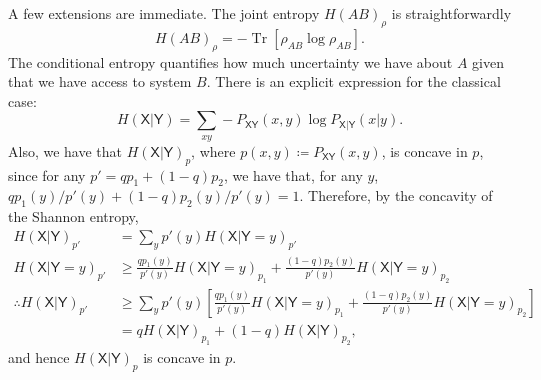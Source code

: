 \documentclass[10pt, a4paper]{article}
\numberwithin{equation}{section} %
\theoremstyle{definition}
\theoremstyle{plain}
\newcommand{\?}{\mathrel{?}} %
\newcommand{\Tr}[2][]{\mathop{\mathrm{Tr}#1}\left[ #2 \right]} %
\newcommand{\crv}[1]{\mathsf{#1}}
\begin{document}
\begin{appendices}
                          A few extensions are immediate. The joint entropy \(H{(AB)}_{\rho}\) is straightforwardly
                          \begin{equation}
                            H{(AB)}_{\rho} = -\Tr{\rho_{AB}\log\rho_{AB}}.
                          \end{equation}
                          The conditional entropy quantifies how much uncertainty we have about \(A\) given that we have access to system \(B\). There is an explicit expression for the classical case:
                          \begin{equation}
                            H(\crv{X}|\crv{Y}) = \sum_{xy} - P_{\crv{XY}}(x,y) \log P_{\crv{X}|\crv{Y}}(x|y).
                          \end{equation}
                          Also, we have that \(H{(\crv{X}|\crv{Y})}_p\), where \(p(x,y) \coloneqq P_{\crv{XY}}(x, y)\), is concave in \(p\), since for any \(p' = qp_1 + (1-q)p_2\), we have that, for any \(y\), \(qp_1(y)/p'(y) + (1-q)p_2(y)/p'(y) = 1\). Therefore, by the concavity of the Shannon entropy,
                          \begin{align*}
                            H{(\crv{X}|\crv{Y})}_{p'} &= \sum_y p'(y) H{(\crv{X}|\crv{Y}=y)}_{p'} \\
                            H{(\crv{X}|\crv{Y}=y)}_{p'} &\geq \frac{qp_1(y)}{p'(y)}H{(\crv{X}|\crv{Y}=y)}_{p_1} + \frac{(1-q)p_2(y)}{p'(y)}H{(\crv{X}|\crv{Y}=y)}_{p_2} \\
                            \therefore H{(\crv{X}|\crv{Y})}_{p'} &\geq \sum_y p'(y) \left[ \frac{qp_1(y)}{p'(y)}H{(\crv{X}|\crv{Y}=y)}_{p_1} + \frac{(1-q)p_2(y)}{p'(y)}H{(\crv{X}|\crv{Y}=y)}_{p_2} \right] \\
                                                                 &= qH{(\crv{X}|\crv{Y})}_{p_1} + (1-q)H{(\crv{X}|\crv{Y})}_{p_2},
                          \end{align*}
                          and hence \(H{(\crv{X}|\crv{Y})}_p\) is concave in \(p\).


\end{appendices}
\end{document}
